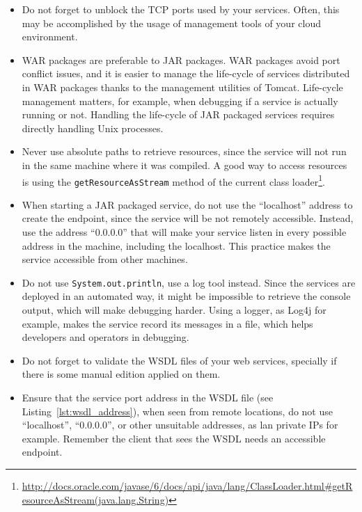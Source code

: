 \begin{itemize}

\item Do not forget to unblock the TCP ports used by your services. Often, this may be accomplished by the usage of management tools of your cloud environment.

\item WAR packages are preferable to JAR packages. WAR packages avoid port conflict issues, and it is easier to manage the life-cycle of services distributed in WAR packages thanks to the management utilities of Tomcat. Life-cycle management matters, for example, when debugging if a service is actually running or not. Handling the life-cycle of JAR packaged services requires directly handling Unix processes.

\item Never use absolute paths to retrieve resources, since the service will not run in the same machine where it was compiled. A good way to access resources is using the \texttt{getResourceAsStream} method of the current class loader\footnote{\url{http://docs.oracle.com/javase/6/docs/api/java/lang/ClassLoader.html\#getResourceAsStream(java.lang.String)}}.

\item When starting a JAR packaged service, do not use the ``localhost'' address to create the endpoint, since the service will be not remotely accessible. Instead, use the address ``0.0.0.0'' that will make your service listen in every possible address in the machine, including the localhost. This practice makes the service accessible from other machines.

\item Do not use \texttt{System.out.println}, use a log tool instead. Since the services are deployed in an automated way, it might be impossible to retrieve the console output, which will make debugging harder. Using a logger, as Log4j for example, makes the service record its messages in a file, which helps developers and operators in debugging.

\item Do not forget to validate the WSDL files of your web services, specially if there is some manual edition applied on them.

\item Ensure that the service port address in the WSDL file (see Listing~\ref{lst:wsdl_address}), when seen from remote locations, do not use ``localhost'', ``0.0.0.0'', or other unsuitable addresses, as lan private IPs for example. Remember the client that sees the WSDL needs an accessible endpoint.


\end{itemize}
